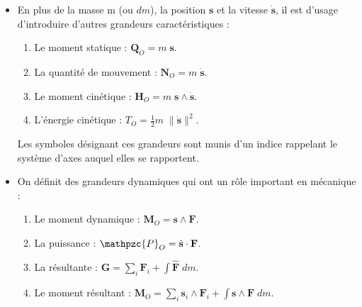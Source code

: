 \documentclass[a4paper]{article}
\begin{document}
\begin{itemize}
\item En plus de la masse m (ou $ d m $), la position $ \textbf{s} $ et la vitesse $ \dot{\textbf{s}} $, il est d'usage d'introduire d'autres grandeurs caractéristiques : 
\begin{enumerate}
\item Le moment statique : $\displaystyle \textbf{Q}_O = m \; \textbf{s} $.
\item La quantité de mouvement : $\displaystyle \textbf{N}_O = m \; \dot{\textbf{s}} $.
\item Le moment cinétique : $\displaystyle \textbf{H}_O = m \; \textbf{s} \wedge \dot{\textbf{s}} $.
\item L'énergie cinétique : $\displaystyle T_O = \frac{1}{2} m \; \| \dot{\textbf{s}} \|^2 $.
\end{enumerate}
Les symboles désignant ces grandeurs sont munis d'un indice rappelant le système d'axes auquel elles se rapportent.





\item On définit des grandeurs dynamiques qui ont un rôle important en mécanique : 
\begin{enumerate}
\item Le moment dynamique : $\displaystyle \textbf{M}_O = \textbf{s} \wedge \textbf{F} $.
\item La puissance : $\displaystyle \mathpzc{P}_O = \dot{\textbf{s}} \cdot \textbf{F} $.
\item La résultante : $\displaystyle \textbf{G} = \sum_i \textbf{F}_i + \int \hat{\textbf{F}} \; d m $.
\item Le moment résultant : $\displaystyle \textbf{M}_O = \sum_i \textbf{s}_i \wedge \textbf{F}_i + \int \textbf{s} \wedge \hat{\textbf{F}} \; d m $.
\end{enumerate}






\end{itemize}
\end{document}
